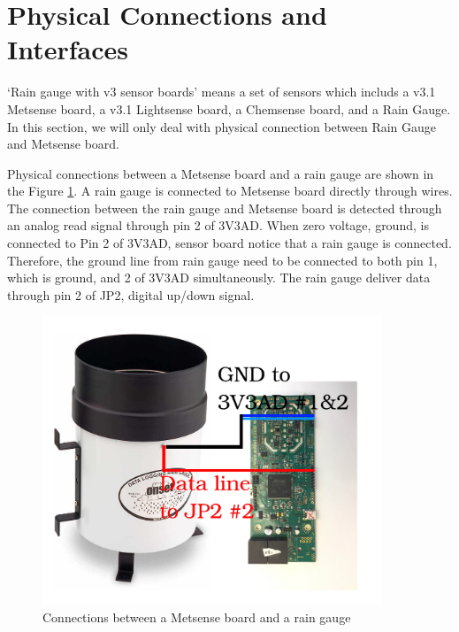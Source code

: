 \section{Physical Connections and Interfaces}

`Rain gauge with v3 sensor boards' means a set of sensors which includs a v3.1 Metsense board, a v3.1 Lightsense board, a Chemsense board, and a Rain Gauge.
In this section, we will only deal with physical connection between Rain Gauge and Metsense board.
\par

Physical connections between a Metsense board and a rain gauge are shown in the Figure \ref{fig:connect}. A rain gauge is connected to Metsense board directly through wires. The connection between the rain gauge and Metsense board is detected through an analog read signal through pin 2 of 3V3AD. When zero voltage, ground, is connected to Pin 2 of 3V3AD, sensor board notice that a rain gauge is connected. Therefore, the ground line from rain gauge need to be connected to both pin 1, which is ground, and 2 of 3V3AD simultaneously. The rain gauge deliver data through pin 2 of JP2, digital up/down signal.



\begin{figure}[h]
\begin{center}
\includegraphics[width=4in]{con.png}
\caption{Connections between a Metsense board and a rain gauge}
\label{fig:connect}
\end{center}
\end{figure}

